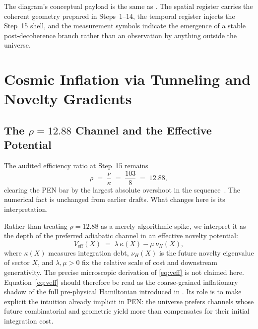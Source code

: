 \documentclass[11pt,a4paper]{article}
\theoremstyle{plain}
\theoremstyle{definition}
\theoremstyle{remark}
\begin{document}
The diagram's conceptual payload is the same as .
The spatial register carries the coherent geometry prepared in Steps~1--14, the temporal register injects the Step~15 shell, and the measurement symbols indicate the emergence of a stable post-decoherence branch rather than an observation by anything outside the universe.


\section{Cosmic Inflation via Tunneling and Novelty Gradients}
\label{sec:inflation}

\subsection{\texorpdfstring{The $\rho = 12.88$ Channel and the Effective Potential}{The rho = 12.88 channel and the effective potential}}
\label{sec:rho-spike}

The audited efficiency ratio at Step~15 remains
\begin{equation}
    \rho \;=\; \frac{\nu}{\kappa} \;=\; \frac{103}{8} \;=\; 12.88,
\end{equation}
clearing the PEN bar by the largest absolute overshoot in the sequence~\cite{pen}.
The numerical fact is unchanged from earlier drafts.
What changes here is its interpretation.

Rather than treating $\rho = 12.88$ as a merely algorithmic spike, we interpret it as the depth of the preferred adiabatic channel in an effective novelty potential:
\begin{equation}
\label{eq:veff}
    V_{\mathrm{eff}}(X)
    \;=\;
    \lambda\,\kappa(X) - \mu\,\nu_H(X),
\end{equation}
where $\kappa(X)$ measures integration debt, $\nu_H(X)$ is the future novelty eigenvalue of sector $X$, and $\lambda,\mu > 0$ fix the relative scale of cost and downstream generativity.
The precise microscopic derivation of \eqref{eq:veff} is not claimed here.
Equation~\eqref{eq:veff} should therefore be read as the coarse-grained inflationary shadow of the full pre-physical Hamiltonian introduced in .
Its role is to make explicit the intuition already implicit in PEN: the universe prefers channels whose future combinatorial and geometric yield more than compensates for their initial integration cost.
\end{document}
